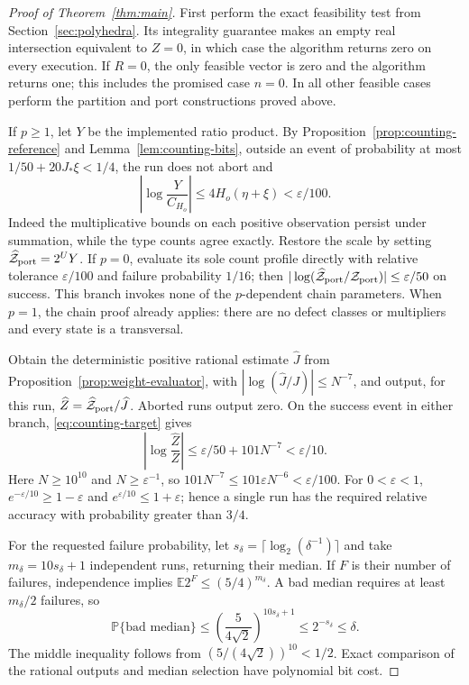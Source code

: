 \begin{proof}[Proof of Theorem~\ref{thm:main}]
First perform the exact feasibility test from Section~\ref{sec:polyhedra}.
Its integrality guarantee makes an empty real intersection equivalent
to $Z=0$, in which case the algorithm returns zero on every execution.
If $R=0$, the only feasible vector is zero and the algorithm returns
one; this includes the promised case $n=0$.  In all other feasible
cases perform the partition and port constructions proved above.

If $p\geq1$, let $Y$ be the implemented ratio product.  By
Proposition~\ref{prop:counting-reference} and
Lemma~\ref{lem:counting-bits}, outside an event of probability at most
$1/50+20J_*\xi<1/4$, the run does not abort and
\[
 \left|\log\frac{Y}{C_{H_o}}\right|
       \leq4H_o(\eta+\xi)<\varepsilon/100.
\]
Indeed the multiplicative bounds on each positive observation persist
under summation, while the type counts agree exactly.  Restore the
scale by setting $\widehat{\mathcal Z}_{\rm port}=2^UY$.
If $p=0$, evaluate its sole count profile directly with relative
tolerance $\varepsilon/100$ and failure probability $1/16$; then
$|\log(\widehat{\mathcal Z}_{\rm port}/\mathcal Z_{\rm port})|
\leq\varepsilon/50$ on success.  This branch invokes none of the
$p$-dependent chain parameters.  When $p=1$, the chain proof already
applies: there are no defect classes or multipliers and every state is
a transversal.

Obtain the deterministic positive rational estimate $\widehat J$ from
Proposition~\ref{prop:weight-evaluator}, with
$|\log(\widehat J/J)|\leq N^{-7}$, and output, for this run,
$\widehat Z=\widehat{\mathcal Z}_{\rm port}/\widehat J$.
Aborted runs output zero.  On the success event in either branch,
\eqref{eq:counting-target} gives
\[
 \left|\log\frac{\widehat Z}{Z}\right|
       \leq\varepsilon/50+101N^{-7}<\varepsilon/10.
\]
Here $N\geq10^{10}$ and $N\geq\varepsilon^{-1}$, so
$101N^{-7}\leq101\varepsilon N^{-6}<\varepsilon/100$.
For $0<\varepsilon<1$, $e^{-\varepsilon/10}\geq1-\varepsilon$
and $e^{\varepsilon/10}\leq1+\varepsilon$; hence a single run has
the required relative accuracy with probability greater than $3/4$.

For the requested failure probability, let
$s_\delta=\lceil\log_2(\delta^{-1})\rceil$ and take
$m_\delta=10s_\delta+1$ independent runs, returning their median.
If $F$ is their number of failures, independence implies
$\mathbb E2^F\leq(5/4)^{m_\delta}$.  A bad median requires at least
$m_\delta/2$ failures, so
\[
 \mathbb P\{\text{bad median}\}
 \leq\left(\frac5{4\sqrt2}\right)^{10s_\delta+1}
 \leq2^{-s_\delta}\leq\delta.
\]
The middle inequality follows from
$(5/(4\sqrt2))^{10}<1/2$.  Exact comparison of the rational outputs
and median selection have polynomial bit cost.


\end{proof}
